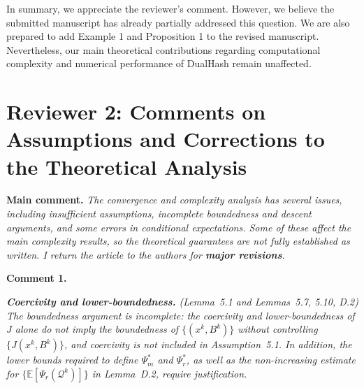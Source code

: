\documentclass[11pt]{article}
\begin{document}
In summary, we appreciate the reviewer’s comment. However, we believe the submitted manuscript has already partially addressed this question. We are also prepared to add Example 1 and Proposition 1 to the revised manuscript. Nevertheless, our main theoretical contributions regarding computational complexity and numerical performance of DualHash remain unaffected. 


\section{Reviewer 2: Comments on Assumptions and Corrections to the Theoretical Analysis}

\vspace{0.5em}
\noindent\textbf{Main comment.} \emph{%
The convergence and complexity analysis has several issues, including
insufficient assumptions, incomplete boundedness and
descent arguments, and some errors in conditional expectations.
Some of these affect the main complexity results, so the
theoretical guarantees are not fully established as written.
I return the article to the authors for \textbf{major revisions}.}

\vspace{0.5em}
\noindent\textbullet\quad\textbf{Comment 1.}

\noindent\emph{\textbf{Coercivity and lower-boundedness.}
(Lemma~5.1 and Lemmas~5.7, 5.10, D.2)
The boundedness argument is incomplete: the coercivity and
lower-boundedness of $J$ alone do not imply the boundedness of
$\{(x^k,B^k)\}$ without controlling
$\{J(x^k,B^k)\}$, and coercivity is not included in
Assumption~5.1. In addition, the lower bounds required to define
$\Psi_m^*$ and $\Psi_r^*$, as well as the non-increasing estimate for
$\{\mathbb{E}[\Psi_r(\mathcal{Q}^k)]\}$ in Lemma~D.2, require
justification.}


\end{document}
